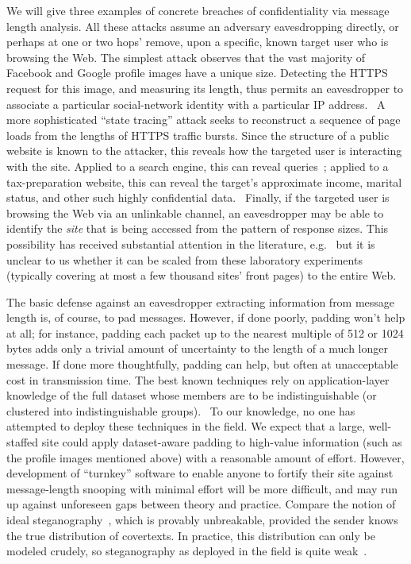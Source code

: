 \documentclass[oneside]{zarticle}
\begin{document}
\begin{multicols}{2}
We will give three examples of concrete breaches of confidentiality
via message length analysis.  All these attacks assume an adversary
eavesdropping directly, or perhaps at one or two hops' remove, upon a
specific, known target user who is browsing the Web.  The simplest
attack observes that the vast majority of Facebook and Google profile
images have a unique size.  Detecting the HTTPS request for this
image, and measuring its length, thus permits an eavesdropper to
associate a particular social-network identity with a particular IP
address.~\cite{herrmann2012analyzing, pironti2012identifying} A more
sophisticated “state tracing” attack seeks to reconstruct a sequence
of page loads from the lengths of HTTPS traffic bursts.  Since the
structure of a public website is known to the attacker, this reveals
how the targeted user is interacting with the site.  Applied to a
search engine, this can reveal queries~\cite{castelluccia2010private};
applied to a tax-preparation website, this can reveal the target's
approximate income, marital status, and other such highly confidential
data.~\cite{zhang2010sidebuster} Finally, if the targeted user is
browsing the Web via an unlinkable channel, an eavesdropper may be
able to identify the \emph{site} that is being accessed from the
pattern of response sizes.  This possibility has received substantial
attention in the literature, e.g.~\cite{cai2012touching,
  cheng1998traffic, coull2007web, dyer2012peekaboo} but it is unclear
to us whether it can be scaled from these laboratory experiments
(typically covering at most a few thousand sites' front pages) to the
entire Web.

The basic defense against an eavesdropper extracting information from
message length is, of course, to pad messages.  However, if done
poorly, padding won't help at all; for instance, padding each packet
up to the nearest multiple of 512 or 1024 bytes adds only a trivial
amount of uncertainty to the length of a much longer message.  If done
more thoughtfully, padding can help, but often at unacceptable cost in
transmission time.  The best known techniques rely on
application-layer knowledge of the full dataset whose members are to
be indistinguishable (or clustered into indistinguishable
groups).~\cite{chen2010side, mather2012pinpointing,
  backes2013sidechannel} To our knowledge, no one has attempted to
deploy these techniques in the field.  We expect that a large,
well-staffed site could apply dataset-aware padding to high-value
information (such as the profile images mentioned above) with a
reasonable amount of effort.  However, development of “turnkey”
software to enable anyone to fortify their site against message-length
snooping with minimal effort will be more difficult, and may run up
against unforeseen gaps between theory and practice.  Compare the
notion of ideal steganography~\cite{hopper2009provably}, which is
provably unbreakable, provided the sender knows the true distribution
of covertexts.  In practice, this distribution can only be modeled
crudely, so steganography as deployed in the field is quite
weak~\cite{boehme2010steganalysis}.


\end{multicols}
\end{document}

